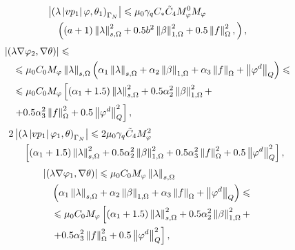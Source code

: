 \begin{equation}
	\begin{split}
		&\left\vert 
			\left( 
				\lambda \left\vert vp_1 \right\vert \varphi, \theta_1
			 \right)_{\Gamma_N}
		 \right\vert 
		\leqslant 
			\mu_0 \gamma_q 
			C_{*} \tilde C_4 
			M_\varphi^0 M_\varphi \\
			&\quad \left( 
				(a + 1) 
				\left\Vert \lambda \right\Vert_{s,\Omega}^2 
				+ 0.5 b^2 
				\left\Vert \beta \right\Vert_{1,\Omega}^2 
				+ 0.5 
				\left\Vert f \right\Vert_\Omega^2,
			 \right),
	\end{split}
\end{equation}
\begin{equation}
	\begin{split}
		&\left\vert 
			\left( \lambda \nabla \varphi_2, \nabla \theta \right)
		 \right\vert 
		\leqslant \\
		&\quad\leqslant 
			\mu_0 
			C_0 
			M_\varphi 
			\left\Vert \lambda \right\Vert_{s,\Omega} 
			\left( 
				\alpha_1 \left\Vert \lambda \right\Vert_{s,\Omega} 
				+ \alpha_2 \left\Vert \beta \right\Vert_{1,\Omega} 
				+ \alpha_3 \left\Vert f \right\Vert_\Omega 
				+ \left\Vert \varphi^d \right\Vert_Q
			 \right) 
		\leqslant \\
		&\quad\leqslant 
			\mu_0 
			C_0 
			M_\varphi 
			\left[ 
				\left( \alpha_1 + 1.5 \right) 
				\left\Vert \lambda \right\Vert_{s,\Omega}^2 
				+ 0.5 \alpha_2^2 
				\left\Vert \beta \right\Vert_{1,\Omega}^2 + \right. \\
				&\quad\left. + 0.5 \alpha_3^2 
				\left\Vert f \right\Vert_\Omega^2 
				+ 0.5 
				\left\Vert \varphi^d \right\Vert_Q^2 
			 \right],
	\end{split}
\end{equation}
\begin{equation}
	\begin{split}
		2 &\left\vert  
			\left( \lambda \left\vert vp_1 \right\vert \varphi_1, \theta \right)_{\Gamma_N} 
		 \right\vert 
		\leqslant 
			2 \mu_0 \gamma_q 
			\tilde C_4 
			M_\varphi^2 \\
			&\quad \left[ 
				\left( \alpha_1 + 1.5 \right) 
				\left\Vert \lambda \right\Vert_{s,\Omega}^2 
				+ 0.5 \alpha_2^2 
				\left\Vert \beta \right\Vert_{1,\Omega}^2 
				+ 0.5 \alpha_3^2 
				\left\Vert f \right\Vert_\Omega^2 
				+ 0.5 
				\left\Vert \varphi^d \right\Vert_Q^2 
			 \right],
	\end{split}
\end{equation}
\begin{equation}
	\begin{split}
		&\left\vert  
			(\lambda \nabla \varphi_1, \nabla \theta) 
		 \right\vert \leqslant 
			\mu_0 
			C_0 
			M_\varphi 
			\left\Vert \lambda \right\Vert_{s,\Omega} \\
			&\quad \left( 
				\alpha_1 \left\Vert \lambda \right\Vert_{s,\Omega} 
				+ \alpha_2 \left\Vert \beta \right\Vert_{1,\Omega} 
				+ \alpha_3 \left\Vert f \right\Vert_\Omega 
				+ \left\Vert \varphi^d \right\Vert_Q
			 \right) 
		\leqslant \\
		&\quad\leqslant 
			\mu_0 
			C_0 
			M_\varphi 
			\left[ 
				\left( \alpha_1 + 1.5 \right) 
				\left\Vert \lambda \right\Vert_{s,\Omega}^2 
				+ 0.5 \alpha_2^2 
				\left\Vert \beta \right\Vert_{1,\Omega}^2 + \right. \\
				&\quad \left. + 0.5 \alpha_3^2 
				\left\Vert f \right\Vert_\Omega^2 
				+ 0.5 
				\left\Vert \varphi^d \right\Vert_Q^2 
			 \right],
	\end{split}
\end{equation}

